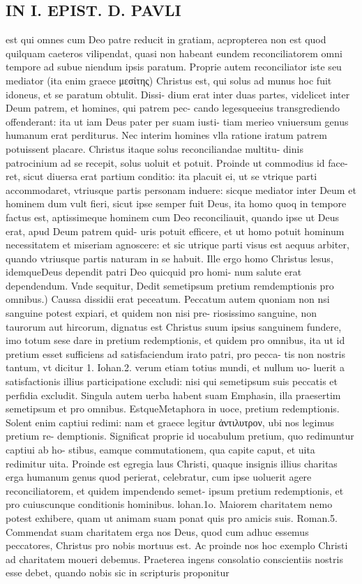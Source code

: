 \documentclass{article}
\begin{document}
\begin{pages}
\section*{IN I. EPIST. D. PAVLI }
\marginpar{[ p.68 ]}\pstart est qui omnes cum Deo patre reducit in gratiam, acpropterea non est quod quilquam caeteros vilipendat, quasi non habeant eundem reconciliatorem omni tempore ad subue niendum ipsis paratum. Proprie autem reconciliator iste seu mediator (ita enim graece μεσίτης) Christus est, qui solus ad munus hoc fuit idoneus, et se paratum obtulit. Dissi- dium erat inter duas partes, videlicet inter Deum patrem, et homines, qui patrem pec- cando legesqueeius transgrediendo offenderant: ita ut iam Deus pater per suam iusti- tiam merieo vniuersum genus humanum erat perditurus. Nec interim homines vlla ratione iratum patrem potuissent placare. Christus itaque  solus reconciliandae multitu- dinis patrocinium ad se recepit, solus uoluit et potuit. Proinde ut commodius id face- ret, sicut diuersa erat partium conditio: ita placuit ei, ut se vtrique  parti accommodaret, vtriusque  partis personam induere: sicque  mediator inter Deum et hominem dum vult fieri, sicut ipse semper fuit Deus, ita homo quoq in tempore factus est, aptissimeque  hominem cum Deo reconciliauit, quando ipse ut Deus erat, apud Deum patrem quid- uris potuit efficere, et ut homo potuit hominum necessitatem et miseriam agnoscere: et sic utrique  parti visus est aequus arbiter, quando vtriusque  partis naturam in se habuit. Ille ergo homo Christus lesus, idemqueDeus dependit patri Deo quicquid pro homi- num salute erat dependendum. Vnde sequitur,  \pend\pstart Dedit semetipsum pretium remdemptionis pro omnibus.) Caussa dissidii erat peceatum. Peccatum autem quoniam non nsi sanguine potest expiari, et quidem non nisi pre- riosissimo sanguine, non taurorum aut hircorum, dignatus est Christus suum ipsius sanguinem fundere, imo totum sese dare in pretium redemptionis, et quidem pro omnibus, ita ut id pretium esset sufficiens ad satisfaciendum irato patri, pro pecca- tis non nostris tantum, vt dicitur 1. Iohan.2. verum etiam totius mundi, et nullum uo- luerit a satisfactionis illius participatione excludi: nisi qui semetipsum suis peccatis et perfidia excludit. Singula autem uerba habent suam Emphasin, illa praesertim semetipsum et pro omnibus. EstqueMetaphora in uoce, pretium redemptionis. Solent enim captiui redimi: nam et graece legitur ἀντιλυτρον, ubi nos legimus pretium re- demptionis. Significat proprie id uocabulum pretium, quo redimuntur captiui ab ho- stibus, eamque  commutationem, qua capite caput, et uita redimitur uita. Proinde est egregia laus Christi, quaque  insignis illius charitas erga humanum genus quod perierat, celebratur, cum ipse uoluerit agere reconciliatorem, et quidem impendendo semet- ipsum pretium redemptionis, et pro cuiuscunque  conditionis hominibus. lohan.1o. Maiorem charitatem nemo potest exhibere, quam ut animam suam ponat quis pro amicis suis. Roman.5. Commendat suam charitatem erga nos Deus, quod cum adhuc essemus peccatores, Christus pro nobis mortuus est. Ac proinde nos hoc exemplo Christi ad charitatem moueri debemus. Praeterea ingens consolatio conscientiis nostris esse debet, quando nobis sic in scripturis proponitur 
\end{pages}
\end{document}
